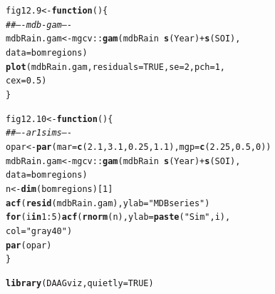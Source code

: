\documentclass[12pt, a4paper,  BCOR=8.25mm, DIV=15]{scrartcl}\usepackage[]{graphicx}\usepackage[]{color}
\makeatletter
\newcommand{\hlnum}[1]{\textcolor[rgb]{0.686,0.059,0.569}{#1}}%
\newcommand{\hlstr}[1]{\textcolor[rgb]{0.192,0.494,0.8}{#1}}%
\newcommand{\hlcom}[1]{\textcolor[rgb]{0.678,0.584,0.686}{\textit{#1}}}%
\newcommand{\hlopt}[1]{\textcolor[rgb]{0,0,0}{#1}}%
\newcommand{\hlstd}[1]{\textcolor[rgb]{0.345,0.345,0.345}{#1}}%
\newcommand{\hlkwa}[1]{\textcolor[rgb]{0.161,0.373,0.58}{\textbf{#1}}}%
\newcommand{\hlkwb}[1]{\textcolor[rgb]{0.69,0.353,0.396}{#1}}%
\newcommand{\hlkwc}[1]{\textcolor[rgb]{0.333,0.667,0.333}{#1}}%
\newcommand{\hlkwd}[1]{\textcolor[rgb]{0.737,0.353,0.396}{\textbf{#1}}}%
\newenvironment{kframe}{%
 \def\at@end@of@kframe{}%
 \ifinner\ifhmode%
  \def\at@end@of@kframe{\end{minipage}}%
  \begin{minipage}{\columnwidth}%
 \fi\fi%
 \def\FrameCommand##1{\hskip\@totalleftmargin \hskip-\fboxsep
 \colorbox{shadecolor}{##1}\hskip-\fboxsep
     \hskip-\linewidth \hskip-\@totalleftmargin \hskip\columnwidth}%
 \MakeFramed {\advance\hsize-\width
   \@totalleftmargin\z@ \linewidth\hsize
   \@setminipage}}%
 {\par\unskip\endMakeFramed%
 \at@end@of@kframe}
\newenvironment{knitrout}{}{} %
\makeatother
\begin{document}
\begin{knitrout}
\color{fgcolor}\begin{kframe}
\begin{alltt}
\hlstd{fig12.9} \hlkwb{<-} \hlkwa{function}\hlstd{()\{}
\hlcom{## ---- mdb-gam ----}
\hlstd{mdbRain.gam} \hlkwb{<-} \hlstd{mgcv}\hlopt{::}\hlkwd{gam}\hlstd{(mdbRain} \hlopt{~} \hlkwd{s}\hlstd{(Year)} \hlopt{+} \hlkwd{s}\hlstd{(SOI),}
                   \hlkwc{data}\hlstd{=bomregions)}
\hlkwd{plot}\hlstd{(mdbRain.gam,} \hlkwc{residuals}\hlstd{=}\hlnum{TRUE}\hlstd{,} \hlkwc{se}\hlstd{=}\hlnum{2}\hlstd{,} \hlkwc{pch}\hlstd{=}\hlnum{1}\hlstd{,}
     \hlkwc{cex}\hlstd{=}\hlnum{0.5}\hlstd{)}
\hlstd{\}}
\end{alltt}
\end{kframe}
\end{knitrout}

\begin{knitrout}
\color{fgcolor}\begin{kframe}
\begin{alltt}
\hlstd{fig12.10} \hlkwb{<-} \hlkwa{function}\hlstd{()\{}
\hlcom{## ---- ar1sims ----}
\hlstd{opar} \hlkwb{<-} \hlkwd{par}\hlstd{(}\hlkwc{mar}\hlstd{=}\hlkwd{c}\hlstd{(}\hlnum{2.1}\hlstd{,} \hlnum{3.1}\hlstd{,} \hlnum{0.25}\hlstd{,} \hlnum{1.1}\hlstd{),} \hlkwc{mgp}\hlstd{=}\hlkwd{c}\hlstd{(}\hlnum{2.25}\hlstd{,}\hlnum{0.5}\hlstd{,}\hlnum{0}\hlstd{))}
\hlstd{mdbRain.gam} \hlkwb{<-} \hlstd{mgcv}\hlopt{::}\hlkwd{gam}\hlstd{(mdbRain} \hlopt{~} \hlkwd{s}\hlstd{(Year)} \hlopt{+} \hlkwd{s}\hlstd{(SOI),}
                         \hlkwc{data}\hlstd{=bomregions)}
\hlstd{n} \hlkwb{<-}  \hlkwd{dim}\hlstd{(bomregions)[}\hlnum{1}\hlstd{]}
\hlkwd{acf}\hlstd{(}\hlkwd{resid}\hlstd{(mdbRain.gam),} \hlkwc{ylab}\hlstd{=}\hlstr{"MDB series"}\hlstd{)}
\hlkwa{for}\hlstd{(i} \hlkwa{in} \hlnum{1}\hlopt{:}\hlnum{5}\hlstd{)}\hlkwd{acf}\hlstd{(}\hlkwd{rnorm}\hlstd{(n),} \hlkwc{ylab}\hlstd{=}\hlkwd{paste}\hlstd{(}\hlstr{"Sim"}\hlstd{,i),}
                 \hlkwc{col}\hlstd{=}\hlstr{"gray40"}\hlstd{)}
\hlkwd{par}\hlstd{(opar)}
\hlstd{\}}
\end{alltt}
\end{kframe}
\end{knitrout}

\begin{knitrout}
\color{fgcolor}\begin{kframe}
\begin{alltt}
\hlkwd{library}\hlstd{(DAAGviz,} \hlkwc{quietly} \hlstd{=} \hlnum{TRUE}\hlstd{)}
\end{alltt}
\end{kframe}
\end{knitrout}
\end{document}
